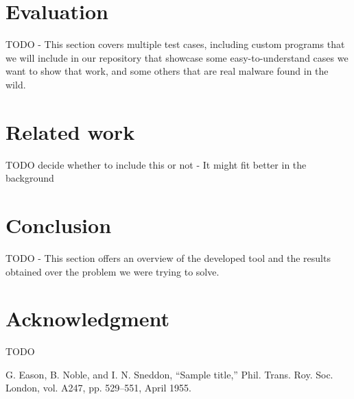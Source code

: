 \documentclass[conference]{IEEEtran}
\begin{document}
\section{Evaluation}
TODO - This section covers multiple test cases, including custom programs that we will include in our repository that showcase
some easy-to-understand cases we want to show that work, and some others that are real malware found in the wild.

\section{Related work}
TODO decide whether to include this or not - It might fit better in the background

\section{Conclusion}
TODO - This section offers an overview of the developed tool and the results obtained over the problem we were trying to solve.

\section*{Acknowledgment}
TODO

\begin{thebibliography}{00}
 G. Eason, B. Noble, and I. N. Sneddon, ``Sample title,'' Phil. Trans. Roy. Soc. London, vol. A247, pp. 529--551, April 1955.
\end{thebibliography}
\vspace{12pt}
\end{document}

